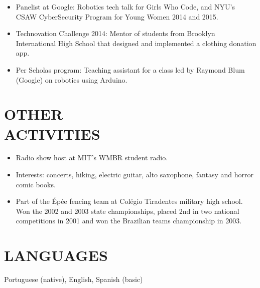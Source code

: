 \documentclass[line,margin]{res}
\begin{document}
\begin{resume}
\begin{itemize}
	      \item Panelist at Google: Robotics tech talk for Girls Who Code, and NYU's 
	      CSAW CyberSecurity Program for Young Women 2014 and 2015.
	      \item Technovation Challenge 2014: Mentor of students from Brooklyn International High School that designed and implemented a clothing donation app.
	      \item Per Scholas program: Teaching assistant for a class led by Raymond Blum (Google) on robotics using Arduino.
               \end{itemize}
                
\section{OTHER \\ ACTIVITIES}        
            \begin{itemize}  \itemsep -2pt
            \item Radio show host at MIT's WMBR student radio.
            \item Interests: concerts, hiking, electric guitar, alto saxophone, fantasy and horror comic books.
            \item Part of the \'{E}p\'{e}e fencing team at Col\'{e}gio Tiradentes military high school. Won the 2002 and 2003 state championships, placed 2nd in two national competitions in 2001 and won the Brazilian teams championship in 2003. 
            \end{itemize}
            
\section{LANGUAGES} 
Portuguese (native), English, Spanish (basic)
           

\end{resume}
\end{document}
